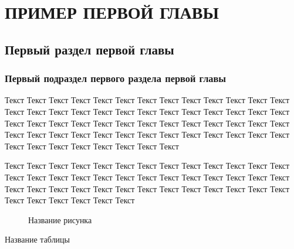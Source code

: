 \chapter{ПРИМЕР ПЕРВОЙ ГЛАВЫ}
\section{Первый раздел первой главы}
\subsection{Первый подраздел первого раздела первой главы}

Текст Текст Текст Текст Текст Текст Текст Текст Текст Текст Текст Текст Текст Текст Текст Текст Текст Текст Текст Текст Текст Текст Текст Текст Текст Текст Текст Текст Текст Текст Текст Текст Текст Текст Текст Текст Текст Текст Текст Текст Текст Текст Текст Текст Текст Текст Текст Текст Текст Текст Текст Текст Текст Текст Текст Текст Текст Текст Текст Текст 

Текст Текст Текст Текст Текст Текст Текст Текст Текст Текст Текст Текст Текст Текст Текст Текст Текст Текст Текст Текст Текст Текст Текст Текст Текст Текст Текст Текст Текст Текст Текст Текст Текст Текст Текст Текст Текст Текст Текст Текст Текст Текст Текст Текст Текст

\begin{figure}
  \caption{Название рисунка}
\end{figure}

\begin{table}
  \caption{Название таблицы}
\end{table}
